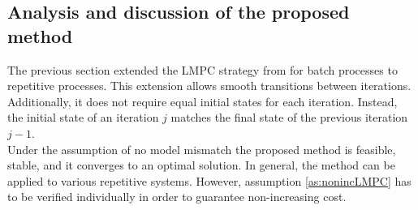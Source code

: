 \subsection{Analysis and discussion of the proposed method}
The previous section extended the LMPC strategy from \cite{Rosolia2016} for batch processes to repetitive processes. This extension allows smooth transitions between iterations. Additionally, it does not require equal initial states for each iteration. Instead, the initial state of an iteration $j$ matches the final state of the previous iteration $j-1$.\\
Under the assumption of no model mismatch the proposed method is feasible, stable, and it converges to an optimal solution. In general, the method can be applied to various repetitive systems. However, assumption \ref{as:nonincLMPC} has to be verified individually in order to guarantee non-increasing cost.

